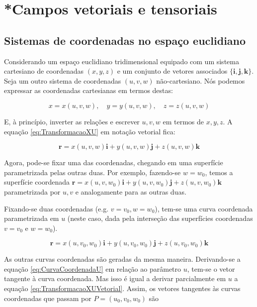 \chapter{*Campos vetoriais e tensoriais}\label{cap:CamposVetoriaisETensoriais}
\section{Sistemas de coordenadas no espaço euclidiano}\label{sec:SistemasCoordenadasEspacoEuclideano}
Considerando um espaço euclidiano tridimensional equipado com um sistema cartesiano de coordenadas $ (x,y,z) $ e um conjunto de vetores associados $ \{\mathbf{i}, \mathbf{j}, \mathbf{k}\} $. Seja um outro sistema de coordenadas $ (u,v,w) $ não-cartesiano. Nós podemos expressar as coordenadas cartesianas em termos destas:

\begin{equation}\label{eq:TransformacaoXU}
	x=x(u, v, w), \quad y=y(u, v, w), \quad z=z(u, v, w)
\end{equation}
	
E, à princípio, inverter as relações e escrever $ u,v,w $ em termos de $ x,y,z $. A equação \ref{eq:TransformacaoXU} em notação vetorial fica:

\begin{equation}\label{eq:TransformacaoXUVetorial}
\mathbf{r}=x(u, v, w) \mathbf{i}+y(u, v, w) \mathbf{j}+z(u, v, w) \mathbf{k}
\end{equation}

Agora, pode-se fixar uma das coordenadas, chegando em uma superfície parametrizada pelas outras duas. Por exemplo, fazendo-se $ w=w_0 $, temos a superfície coordenada $ \mathbf{r}=x\left(u, v, w_{0}\right) \mathbf{i}+y\left(u, v, w_{0}\right) \mathbf{j}+z\left(u, v, w_{0}\right) \mathbf{k} $ parametrizada por $ u,v $ e analogamente para as outras duas.

Fixando-se duas coordenadas (e.g. $ v=v_0,w=w_0 $), tem-se uma curva coordenada parametrizada em $ u $ (neste caso, dada pela interseção das superfícies coordenadas $ v=v_0 $ e $ w=w_0 $).

\begin{equation}\label{eq:CurvaCoordenadaU}
 \mathbf{r}=x\left(u, v_{0}, w_{0}\right) \mathbf{i}+y\left(u, v_{0}, w_{0}\right) \mathbf{j}+z\left(u, v_{0}, w_{0}\right) \mathbf{k} 
\end{equation}

As outras curvas coordenadas são geradas da mesma maneira. Derivando-se a equação \ref{eq:CurvaCoordenadaU} em relação ao parâmetro $ u $, tem-se o vetor tangente à curva coordenada. Mas isso é igual a derivar parcialmente em $ u $ a equação \ref{eq:TransformacaoXUVetorial}. Assim, os vetores tangentes às curvas coordenadas que passam por $ P=(u_0,v_0,w_0) $ são



